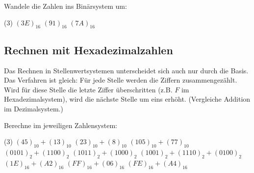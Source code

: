\documentclass[10pt, a4paper]{arbeitsblatt}
\begin{document}
\begin{aufgabe}
	Wandele die Zahlen ins Binärsystem um:
	\begin{tasks}(3)
		\task $(3E)_{16}$ \task $(91)_{16}$ \task $(7A)_{16}$
	\end{tasks}
\end{aufgabe}

\subsection*{Rechnen mit Hexadezimalzahlen}
Das Rechnen in Stellenwertsystemen unterscheidet sich auch nur durch die Basis.
Das Verfahren ist gleich: Für jede Stelle werden die Ziffern zusammengezählt.
Wird für diese Stelle die letzte Ziffer überschritten (z.B.
$F$ im Hexadezimalsystem), wird die nächste Stelle um eins
erhöht. (Vergleiche Addition im Dezimalsystem.)

\begin{aufgabe}
	Berechne im jeweiligen Zahlensystem:
	\begin{tasks}(3)
		\task $(45)_{10} +
				(13)_{10}$ \task $(23)_{10} +
				(8)_{10}$ \task $(105)_{10} +
				(77)_{10}$
		\task $(0101)_{2} +
				(1100)_{2}$ \task $(1011)_{2} +
				(1000)_{2}$ \task $(1001)_{2} +
				(1110)_{2} +
				(0100)_{2}$
		\task $(1E)_{16} +
				(A2)_{16}$ \task $(FF)_{16} +
				(06)_{16}$ \task $(FE)_{16} +
				(A4)_{16}$
	\end{tasks}
\end{aufgabe}
\end{document}
